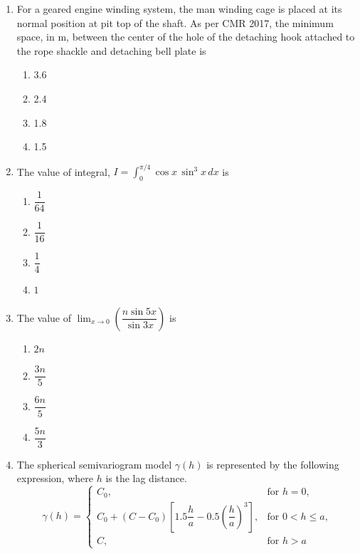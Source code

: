 \documentclass[journal]{IEEEtran}
\begin{document}
\begin{enumerate}[leftmargin=0pt]
\begin{enumerate}
\end{enumerate}
\hfill{}
\item For a geared engine winding system, the man winding cage is placed at its normal position at pit top of the shaft. As per CMR 2017, the minimum space, in m, between the center of the hole of the detaching hook attached to the rope shackle and detaching bell plate is
\begin{enumerate}
\item 3.6
\item 2.4
\item 1.8
\item 1.5
\end{enumerate}
\hfill{}
\item The value of integral, $I = \int_{0}^{\pi/4} \cos x \, \sin^{3}x \, dx$ is

\begin{enumerate}
    \item $\dfrac{1}{64}$\\[0.5em]
    \item $\dfrac{1}{16}$\\[0.5em]
    \item $\dfrac{1}{4}$\\[0.5em]
    \item $1$
\end{enumerate}

\hfill{}
\item The value of $\lim_{x \to 0} \left(\dfrac{n \sin 5x}{\sin 3x}\right)$ is

\begin{enumerate}
    \item $2n$\\[0.5em]
    \item $\dfrac{3n}{5}$\\[0.5em]
    \item $\dfrac{6n}{5}$\\[0.5em]
    \item $\dfrac{5n}{3}$\\[0.5em]
\end{enumerate}
\hfill{}
\item The spherical semivariogram model $\gamma(h)$ is represented by the following 
expression, where $h$ is the lag distance.
\[
\gamma(h) =
\begin{cases}
C_{0}, & \text{for } h = 0, \\[0.5em]
C_{0} + (C - C_{0})\left[1.5 \dfrac{h}{a} - 0.5 \left(\dfrac{h}{a}\right)^3 \right], & \text{for } 0 < h \leq a, \\[0.5em]
C, & \text{for } h > a
\end{cases}
\]


\end{enumerate}
\end{document}

